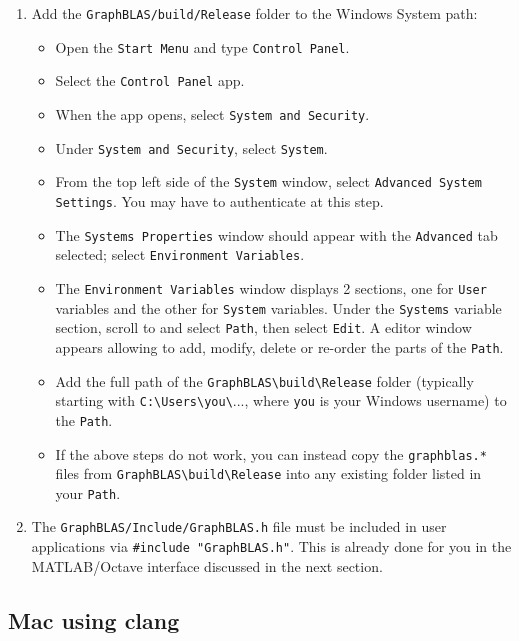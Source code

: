 \documentclass[12pt]{article}
\begin{document}
\begin{enumerate}
\item Add the \verb'GraphBLAS/build/Release' folder to the Windows System path:

    \begin{itemize}
    \item Open the \verb'Start Menu' and type \verb'Control Panel'.
    \item Select the \verb'Control Panel' app.
    \item When the app opens, select \verb'System and Security'.
    \item Under \verb'System and Security', select \verb'System'.
    \item From the top left side of the \verb'System' window, select
        \verb'Advanced System Settings'.  You may have to authenticate
        at this step.
    \item The \verb'Systems Properties' window should appear with the
        \verb'Advanced' tab selected;
        select \verb'Environment Variables'.
    \item The \verb'Environment Variables' window displays 2 sections, one for
        \verb'User' variables and the other for \verb'System' variables.  Under
        the \verb'Systems' variable section, scroll to and select \verb'Path',
        then select \verb'Edit'.   A editor window appears allowing to add,
        modify, delete or re-order the parts of the \verb'Path'.
    \item Add the full path of the \verb'GraphBLAS\build\Release' folder
        (typically starting with \verb'C:\Users\you\'..., where \verb'you' is
        your Windows username) to the \verb'Path'.
    \item If the above steps do not work, you can instead copy the
        \verb'graphblas.*' files from \verb'GraphBLAS\build\Release' into any
        existing folder listed in your \verb'Path'.
    \end{itemize}

\item The \verb'GraphBLAS/Include/GraphBLAS.h' file must be included in user
    applications via \verb'#include "GraphBLAS.h"'.  This is already done for
    you in the MATLAB/Octave interface discussed in the next section.

\end{enumerate}

\subsection{Mac using clang}
\end{document}
